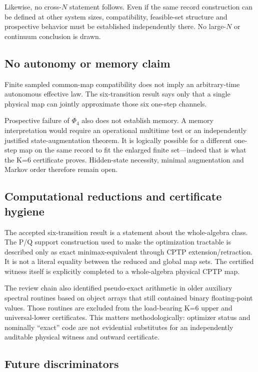Likewise, no cross-$N$ statement follows.  Even if the same record construction can be defined at other system sizes, compatibility, feasible-set structure and prospective behavior must be established independently there.  No large-$N$ or continuum conclusion is drawn.

\subsection{No autonomy or memory claim}

Finite sampled common-map compatibility does not imply an arbitrary-time autonomous effective law.  The six-transition result says only that a single physical map can jointly approximate those six one-step channels.

Prospective failure of $\Phi_4$ also does not establish memory.  A memory interpretation would require an operational multitime test or an independently justified state-augmentation theorem.  It is logically possible for a different one-step map on the same record to fit the enlarged finite set---indeed that is what the K=6 certificate proves.  Hidden-state necessity, minimal augmentation and Markov order therefore remain open.

\subsection{Computational reductions and certificate hygiene}

The accepted six-transition result is a statement about the whole-algebra class.  The P/Q support construction used to make the optimization tractable is described only as exact minimax-equivalent through CPTP extension/retraction.  It is not a literal equality between the reduced and global map sets.  The certified witness itself is explicitly completed to a whole-algebra physical CPTP map.

The review chain also identified pseudo-exact arithmetic in older auxiliary spectral routines based on object arrays that still contained binary floating-point values.  Those routines are excluded from the load-bearing K=6 upper and universal-lower certificates.  This matters methodologically: optimizer status and nominally ``exact'' code are not evidential substitutes for an independently auditable physical witness and outward certificate.

\subsection{Future discriminators}

